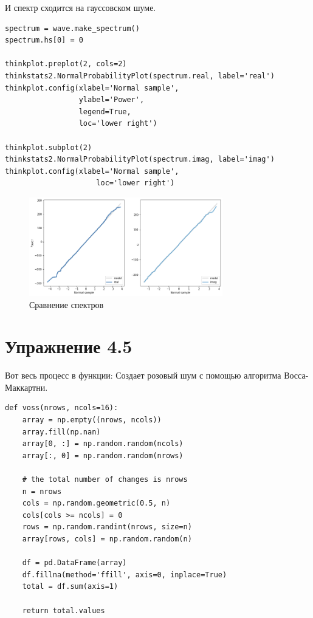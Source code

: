 \documentclass[a4paper,12pt]{report}
\begin{document}
И спектр сходится на гауссовском шуме.

\begin{lstlisting}[caption=Сравнение спектров]
spectrum = wave.make_spectrum()
spectrum.hs[0] = 0

thinkplot.preplot(2, cols=2)
thinkstats2.NormalProbabilityPlot(spectrum.real, label='real')
thinkplot.config(xlabel='Normal sample',
                 ylabel='Power',
                 legend=True,
                 loc='lower right')

thinkplot.subplot(2)
thinkstats2.NormalProbabilityPlot(spectrum.imag, label='imag')
thinkplot.config(xlabel='Normal sample',
                     loc='lower right')
\end{lstlisting}

\begin{figure}[H]
        \centering
        \includegraphics[width=0.75\textwidth]{lab4_fig4_4.png}
        \caption{Сравнение спектров}
        \label{fig:lab4_fig4_4}
\end{figure}

\chapter{Упражнение 4.5}

Вот весь процесс в функции: Создает розовый шум с помощью алгоритма Восса-Маккартни.

\begin{lstlisting}[caption=Создание функции]
def voss(nrows, ncols=16):
    array = np.empty((nrows, ncols))
    array.fill(np.nan)
    array[0, :] = np.random.random(ncols)
    array[:, 0] = np.random.random(nrows)
    
    # the total number of changes is nrows
    n = nrows
    cols = np.random.geometric(0.5, n)
    cols[cols >= ncols] = 0
    rows = np.random.randint(nrows, size=n)
    array[rows, cols] = np.random.random(n)

    df = pd.DataFrame(array)
    df.fillna(method='ffill', axis=0, inplace=True)
    total = df.sum(axis=1)

    return total.values
\end{lstlisting}
\end{document}
